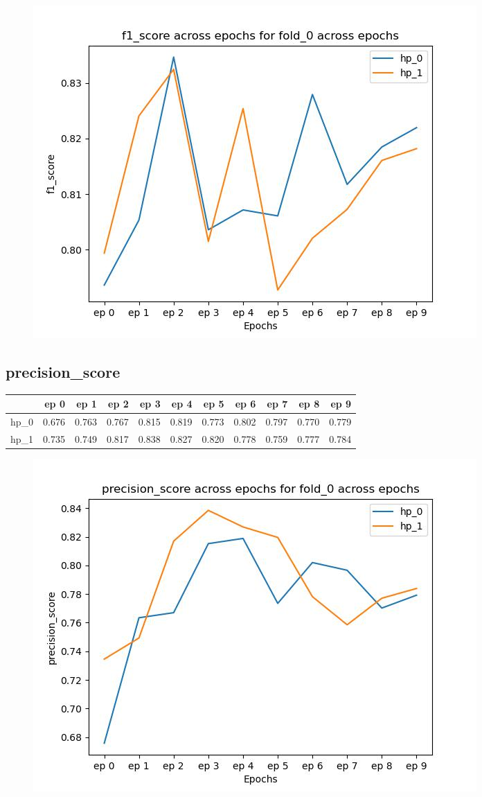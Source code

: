 \documentclass{article}
\begin{document}
\begin{figure}[H]
\includegraphics[scale = 0.75]{fold_0/f1_score}
\end{figure}
\subsection{precision\_score}
\begin{tabular}{lrrrrrrrrrr}
\toprule
{} &   ep 0 &   ep 1 &   ep 2 &   ep 3 &   ep 4 &   ep 5 &   ep 6 &   ep 7 &   ep 8 &   ep 9 \\
\midrule
hp\_0 &  0.676 &  0.763 &  0.767 &  0.815 &  0.819 &  0.773 &  0.802 &  0.797 &  0.770 &  0.779 \\
hp\_1 &  0.735 &  0.749 &  0.817 &  0.838 &  0.827 &  0.820 &  0.778 &  0.759 &  0.777 &  0.784 \\
\bottomrule
\end{tabular}

\begin{figure}[H]
\includegraphics[scale = 0.75]{fold_0/precision_score}
\end{figure}
\end{document}
